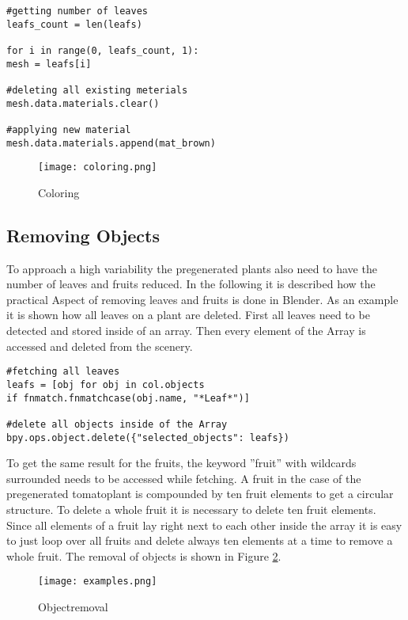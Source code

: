 \lstset{language=Python, frame=single}
\begin{lstlisting}
#getting number of leaves
leafs_count = len(leafs)

for i in range(0, leafs_count, 1):
mesh = leafs[i]

#deleting all existing meterials
mesh.data.materials.clear()

#applying new material
mesh.data.materials.append(mat_brown)
\end{lstlisting}

\begin{figure}[h]
\centering
\texttt{[image: coloring.png]}
\caption{Coloring}
\label{coloring}
\end{figure}

\subsection{Removing Objects}


To approach a high variability the pregenerated plants also need to have the number of leaves and fruits reduced.
In the following it is described how the practical Aspect of removing leaves and fruits is done in Blender.
As an example it is shown how all leaves on a plant are deleted. \newline
First all leaves need to be detected and stored inside of an array. Then every element of the Array is accessed and deleted from the scenery.
\lstset{language=Python, frame=single}
\begin{lstlisting}
#fetching all leaves
leafs = [obj for obj in col.objects
if fnmatch.fnmatchcase(obj.name, "*Leaf*")]

#delete all objects inside of the Array
bpy.ops.object.delete({"selected_objects": leafs})
\end{lstlisting}
To get the same result for the fruits, the keyword ''fruit'' with wildcards surrounded needs to be accessed while fetching. A fruit in the case of the pregenerated tomatoplant is compounded by ten fruit elements to get a circular structure. To delete a whole fruit it is necessary to delete ten fruit elements. Since all elements of a fruit lay right next to each other inside the array it is easy to just loop over all fruits and delete always ten elements at a time to remove a whole fruit.
\newline
The removal of objects is shown in Figure \ref{order}.

\begin{figure}[h]
\centering
\texttt{[image: examples.png]}
\caption{Objectremoval}
\label{order}
\end{figure}


